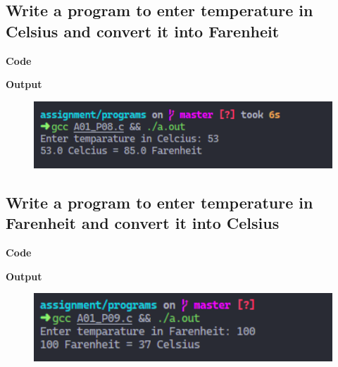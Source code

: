 \documentclass[a4paper]{article}
\begin{document}
\newpage



\subsection{Write a program to enter temperature in Celsius and convert it into Farenheit}
\textbf{Code}



\textbf{Output}

\begin{figure}[h]
  \includegraphics[width=12cm]{A01_P08}
\end{figure}

\newpage



\subsection{Write a program to enter temperature in Farenheit and convert it into Celsius}
\textbf{Code}



\textbf{Output}

\begin{figure}[h]
  \includegraphics[width=12cm]{A01_P09}
\end{figure}

\newpage

\end{document}
